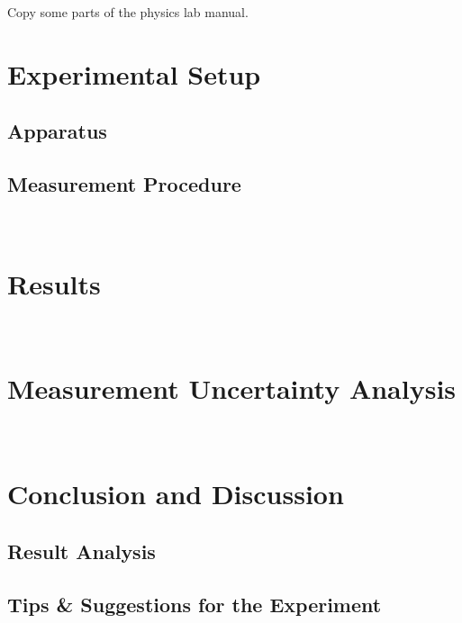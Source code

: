 \documentclass{article}
\begin{document}
Copy some parts of the physics lab manual.
\

\section{Experimental Setup}
\subsection{Apparatus}


\subsection{Measurement Procedure}

\
\

\section{Results}

\
\

\section{Measurement Uncertainty Analysis}
\
\

\section{Conclusion and Discussion}
\subsection{Result Analysis}



\subsection{Tips \& Suggestions for the Experiment}
\end{document}
